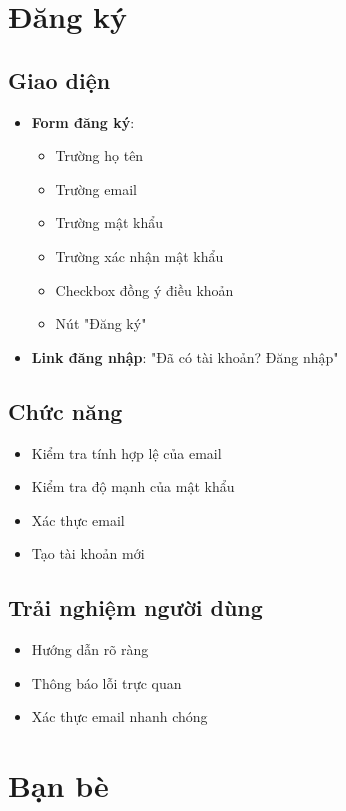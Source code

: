 \documentclass{article}
\begin{document}
\section{Đăng ký}
\subsection{Giao diện}
\begin{itemize}
    \item \textbf{Form đăng ký}:
    \begin{itemize}
        \item Trường họ tên
        \item Trường email
        \item Trường mật khẩu
        \item Trường xác nhận mật khẩu
        \item Checkbox đồng ý điều khoản
        \item Nút "Đăng ký"
    \end{itemize}
    \item \textbf{Link đăng nhập}: "Đã có tài khoản? Đăng nhập"
\end{itemize}

\subsection{Chức năng}
\begin{itemize}
    \item Kiểm tra tính hợp lệ của email
    \item Kiểm tra độ mạnh của mật khẩu
    \item Xác thực email
    \item Tạo tài khoản mới
\end{itemize}

\subsection{Trải nghiệm người dùng}
\begin{itemize}
    \item Hướng dẫn rõ ràng
    \item Thông báo lỗi trực quan
    \item Xác thực email nhanh chóng
\end{itemize}

\section{Bạn bè}
\end{document}
